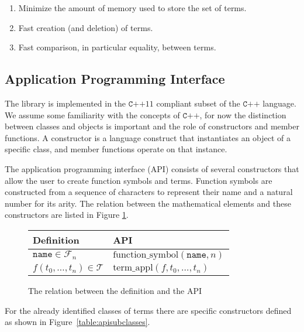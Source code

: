 \documentclass[10pt,a4paper]{article}
\theoremstyle{definition}
\newcommand{\functionsymbols}{\mathcal{F}}
\newcommand{\terms}{\mathcal{T}}
\newcommand{\cpp}{\texttt{C++}}
\begin{document}
\begin{enumerate}
	\item Minimize the amount of memory used to store the set of terms.
	
	\item Fast creation (and deletion) of terms.
	
	\item Fast comparison, in particular equality, between terms.
\end{enumerate}

\subsection{Application Programming Interface}

The library is implemented in the $\cpp 11$ compliant subset of the $\cpp$ language.
We assume some familiarity with the concepts of $\cpp$, for now the distinction between classes and objects is important and the role of constructors and member functions.
A constructor is a language construct that instantiates an object of a specific class, and member functions operate on that instance.

The application programming interface (API) consists of several constructors that allow the user to create function symbols and terms. 
Function symbols are constructed from a sequence of characters to represent their name and a natural number for its arity.
The relation between the mathematical elements and these constructors are listed in Figure \ref{table:apirelation}.

\begin{figure}[H]
\begin{center}
\begin{tabular}{|l|l|}
  \hline
Definition & API \\ \hline
$\texttt{name} \in \functionsymbols_n$ & $\text{function\_symbol}(\texttt{name}, n)$ \\ \hline
$f(t_0, \ldots, t_n) \in \terms$        & $\text{term\_appl}(f, t_0, \ldots, t_n)$ \\ \hline
\end{tabular}
\end{center}
\caption{The relation between the definition and the API}\label{table:apirelation}
\end{figure}

\noindent For the already identified classes of terms there are specific constructors defined as shown in Figure~\ref{table:apisubclasses}.
\end{document}
